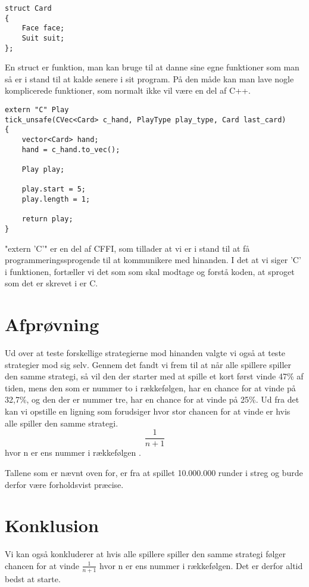 \documentclass[a4paper, 12pt]{article}
\begin{document}
\begin{verbatim}
struct Card
{
	Face face;
	Suit suit;
};
\end{verbatim}
En struct er funktion, man kan bruge til at danne sine egne funktioner som man så er i stand til at kalde senere i sit program. På den måde kan man lave nogle komplicerede funktioner, som normalt ikke vil være en del af C++.
\pagebreak

\begin{verbatim}
extern "C" Play
tick_unsafe(CVec<Card> c_hand, PlayType play_type, Card last_card)
{
	vector<Card> hand;
	hand = c_hand.to_vec();

	Play play;

	play.start = 5;
	play.length = 1;

	return play;
}
\end{verbatim}
"extern 'C'" er en del af CFFI, som tillader at vi er i stand til at få programmeringssprogende til at kommunikere med hinanden. I det at vi siger 'C' i funktionen, fortæller vi det som som skal modtage og forstå koden, at sproget som det er skrevet i er C.

\vfill
\pagebreak

\begin{multicols}{2}
\section{Afprøvning}
Ud over at teste forskellige strategierne mod hinanden valgte vi også at teste strategier mod sig selv. Gennem det fandt vi frem til at når alle spillere spiller den samme strategi, så vil den der starter med at spille et kort først vinde 47\% af tiden, mens den som er nummer to i rækkefølgen, har en chance for at vinde på 32,7\%, og den der er nummer tre, har en chance for at vinde på 25\%. Ud fra det kan vi opstille en ligning som forudsiger hvor stor chancen for at vinde er hvis alle spiller den samme strategi.
$$\frac{1}{n+1}$$ hvor n er ens nummer i rækkefølgen . 

Tallene som er nævnt oven for, er fra at spillet 10.000.000 runder i streg og burde derfor være forholdsvist præcise. 

\section{Konklusion}


Vi kan også konkluderer at hvis alle spillere spiller den samme strategi følger chancen for at vinde $\frac{1}{n+1}$ hvor n er ens nummer i rækkefølgen. Det er derfor altid bedst at starte.
\bigbreak

\vfill
\pagebreak

\end{multicols}
\end{document}
